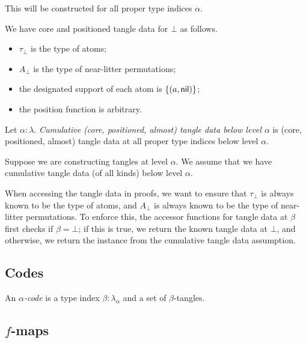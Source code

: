 \documentclass{article}
\begin{document}
\begin{remark}
    This will be constructed for all proper type indices \( \alpha \).
\end{remark}
\begin{definition}
    We have core and positioned tangle data for \( \bot \) as follows.
    \begin{itemize}
        \item \( \tau_\bot \) is the type of atoms;
        \item \( A_\bot \) is the type of near-litter permutations;
        \item the designated support of each atom is \( \qty{(a, \mathsf{nil})} \);
        \item the position function is arbitrary.
    \end{itemize}
\end{definition}
\begin{definition}
    Let \( \alpha : \lambda \).
    \emph{Cumulative (core, positioned, almost) tangle data below level \( \alpha \)} is (core, positioned, almost) tangle data at all proper type indices below level \( \alpha \).
\end{definition}
\begin{ih}
    Suppose we are constructing tangles at level \( \alpha \).
    We assume that we have cumulative tangle data (of all kinds) below level \( \alpha \).
\end{ih}
\begin{remark}
    When accessing the tangle data in proofs, we want to ensure that \( \tau_\bot \) is always known to be the type of atoms, and \( A_\bot \) is always known to be the type of near-litter permutations.
    To enforce this, the accessor functions for tangle data at \( \beta \) first checks if \( \beta = \bot \); if this is true, we return the known tangle data at \( \bot \), and otherwise, we return the instance from the cumulative tangle data assumption.
\end{remark}

\subsection{Codes}

\begin{definition}
    An \emph{\( \alpha \)-code} is a type index \( \beta : \lambda_\alpha \) and a set of \( \beta \)-tangles.
\end{definition}

\subsection{\( f \)-maps}
\end{document}
